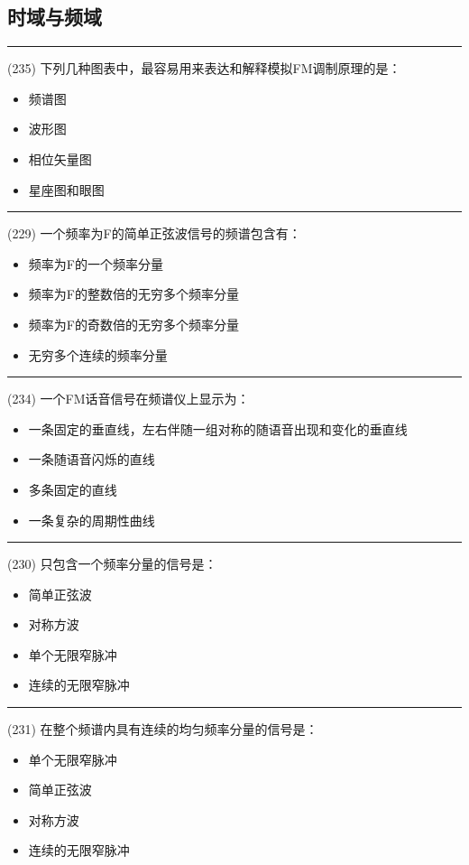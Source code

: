 \documentclass[twocolumn,hyperref,UTF8]{ctexart}  %
\begin{document}
\subsection{时域与频域}


\noindent\rule{0.5\textwidth}{1pt}
\heiti (235) 下列几种图表中，最容易用来表达和解释模拟FM调制原理的是： \songti {\color{gray} [LK0716] }
\begin{itemize}
	\item  频谱图
	\item  波形图
	\item  相位矢量图
	\item  星座图和眼图
\end{itemize}


\noindent\rule{0.5\textwidth}{1pt}
\heiti (229) 一个频率为F的简单正弦波信号的频谱包含有： \songti {\color{gray} [LK0533] }
\begin{itemize}
	\item  频率为F的一个频率分量
	\item  频率为F的整数倍的无穷多个频率分量
	\item  频率为F的奇数倍的无穷多个频率分量
	\item  无穷多个连续的频率分量
\end{itemize}


\noindent\rule{0.5\textwidth}{1pt}
\heiti (234) 一个FM话音信号在频谱仪上显示为： \songti {\color{gray} [LK0713] }
\begin{itemize}
	\item  一条固定的垂直线，左右伴随一组对称的随语音出现和变化的垂直线
	\item  一条随语音闪烁的直线
	\item  多条固定的直线
	\item  一条复杂的周期性曲线
\end{itemize}


\noindent\rule{0.5\textwidth}{1pt}
\heiti (230) 只包含一个频率分量的信号是： \songti {\color{gray} [LK0535] }
\begin{itemize}
	\item  简单正弦波
	\item  对称方波
	\item  单个无限窄脉冲
	\item  连续的无限窄脉冲
\end{itemize}


\noindent\rule{0.5\textwidth}{1pt}
\heiti (231) 在整个频谱内具有连续的均匀频率分量的信号是： \songti {\color{gray} [LK0536] }
\begin{itemize}
	\item  单个无限窄脉冲
	\item  简单正弦波
	\item  对称方波
	\item  连续的无限窄脉冲
\end{itemize}
\end{document}
